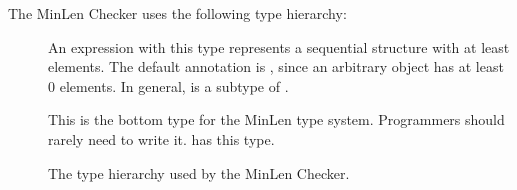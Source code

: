 The MinLen Checker uses the following type hierarchy:

\begin{description}
\item[]
  An expression with this type represents a sequential structure
  with at least  elements.  The default annotation is
  , since an arbitrary object has at least 0 elements.
  In general,  is a subtype of .
\item[]
  This is the bottom type for the MinLen type system.
  Programmers should rarely need to write it.
   has this type.
  \end{description}

\begin{figure}
  \caption{The type hierarchy used by the MinLen Checker.}
  \label{fig-minlen-types}
\end{figure}
